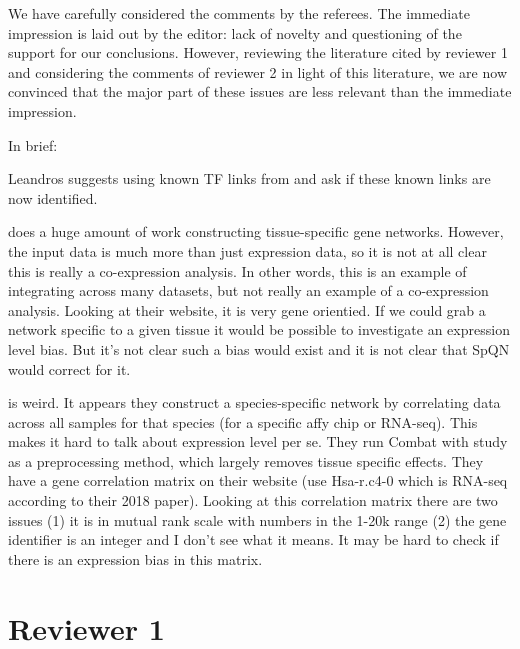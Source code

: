 \documentclass[english,letterpaper,pdftex,12pt]{article}
\begin{document}
\begin{response}
  We have carefully considered the comments by the referees. The immediate impression is laid out by the editor: lack of novelty and questioning of the support for our conclusions. However, reviewing the literature cited by reviewer 1 and considering the comments of reviewer 2 in light of this literature, we are now convinced that the major part of these issues are less relevant than the immediate impression.
  
    In brief: 
    
    
    \citep{Crow2016, Greene2015, Ferrari2018, Obayashi2013}
    
    Leandros suggests using known TF links from \citet{Neph2012} and ask if these known links are now identified.
    
    
    \citet{Greene2015} does a huge amount of work constructing tissue-specific gene networks. However, the input data is much more than just expression data, so it is not at all clear this is really a co-expression analysis. In other words, this is an example of integrating across many datasets, but not really an example of a co-expression analysis. Looking at their website, it is very gene orientied. If we could grab a network specific to a given tissue it would be possible to investigate an expression level bias. But it's not clear such a bias would exist and it is not clear that SpQN would correct for it.
    
    \citet{Obayashi2013} is weird. It appears they construct a species-specific network by correlating data across all samples for that species (for a specific affy chip or RNA-seq). This makes it hard to talk about expression level per se. They run Combat with study as a preprocessing method, which largely removes tissue specific effects.  They have a gene correlation matrix on their website (use Hsa-r.c4-0 which is RNA-seq according to their 2018 paper). Looking at this correlation matrix there are two issues (1) it is in mutual rank scale with numbers in the 1-20k range (2) the gene identifier is an integer and I don't see what it means. It may be hard to check if there is an expression bias in this matrix. 
\end{response}  
  

\section*{Reviewer 1}
\end{document}

